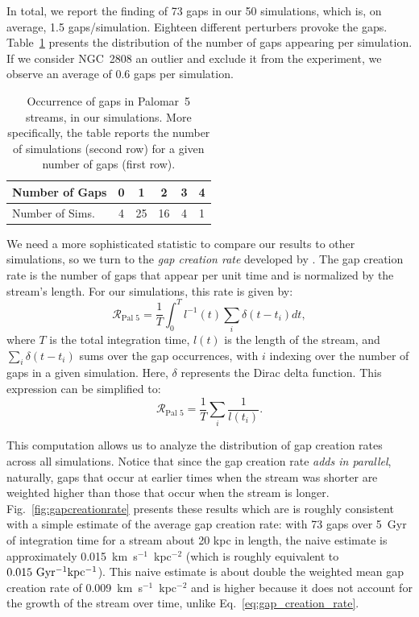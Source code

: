 \documentclass{aa}
\begin{document}
    In total, we report the finding of 73 gaps in our 50 simulations, which is, on average, 1.5 gaps/simulation. Eighteen different perturbers provoke the gaps. Table~\ref{table:gap_distribution} presents the distribution of the number of gaps appearing per simulation. If we consider NGC~2808 an outlier and exclude it from the experiment, we observe an average of 0.6 gaps per simulation.  
    
    \begin{table}[h]
      \centering
        \begin{tabular}{|l|c|c|c|c|c|}
          \hline
          Number of Gaps & 0 & 1 & 2 & 3 & 4 \\
          \hline
          Number of Sims. & 4 & 25 & 16 & 4 & 1 \\
          \hline
        \end{tabular}
        \vspace{0.5cm}
      \caption{Occurrence of gaps in Palomar~5 streams,  in our simulations. More specifically, the table reports the number of simulations (second row) for a given number of gaps (first row). }\label{table:gap_distribution}
    \end{table}

    We need a more sophisticated statistic to compare our results to other simulations, so we turn to the \textit{gap creation rate} developed by \citet{2012ApJ...748...20C}. The gap creation rate is the number of gaps that appear per unit time and is normalized by the stream's length. For our simulations, this rate is given by: \begin{equation} \label{eq:gap_creation_rate} \mathcal{R}_{\textrm{Pal 5}} =  \frac{1}{T}\int_{0}^T l^{-1}(t) \sum_i \delta(t-t_i) dt,\end{equation}where $T$ is the total integration time, $l(t)$ is the length of the stream, and $\sum_i \delta(t-t_i)$ sums over the gap occurrences, with $i$ indexing over the number of gaps in a given simulation. Here, $\delta$ represents the Dirac delta function. This expression can be simplified to:\begin{equation}\mathcal{R}_{\textrm{Pal 5}} =  \frac{1}{T} \sum_i \frac{1}{l (t_i)}. \end{equation}
    
    This computation allows us to analyze the distribution of gap creation rates across all simulations. Notice that since the gap creation rate \textit{adds in parallel}, naturally, gaps that occur at earlier times when the stream was shorter are weighted higher than those that occur when the stream is longer. Fig.~\ref{fig:gapcreationrate} presents these results which are is roughly consistent with a simple estimate of the average gap creation rate: with 73 gaps over 5~Gyr of integration time for a stream about 20 kpc in length, the naive estimate is approximately 0.015~km~s$^{-1}$~kpc$^{-2} $ (which is roughly equivalent to $0.015~\rm{Gyr^{-1}kpc^{-1}}$). This naive estimate is about double the weighted mean gap creation rate of 0.009~km~s$^{-1}$~kpc$^{-2}$ and is higher because it does not account for the growth of the stream over time, unlike Eq.~\ref{eq:gap_creation_rate}.
\end{document}
